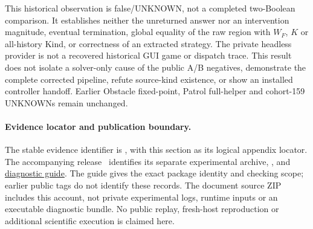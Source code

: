 This historical observation is false/UNKNOWN, not a completed two-Boolean comparison.
It establishes neither the unreturned answer nor an intervention magnitude,
eventual termination, global equality of the raw region with $W_F$, $K$
or all-history Kind, or correctness of an extracted strategy.
The private headless provider is not a recovered historical GUI game or
dispatch trace. This result does not isolate a solver-only cause of the
public A/B negatives, demonstrate the complete corrected pipeline, refute
source-kind existence, or show an installed controller handoff.
Earlier Obstacle fixed-point, Patrol full-helper and cohort-159 UNKNOWNs
remain unchanged.

\paragraph{Evidence locator and publication boundary.}
The stable evidence identifier is
, with this section as its logical
appendix locator. The accompanying release~\cite{artifactrepository}
identifies its separate experimental archive,
, and
\href{https://github.com/research-artifact-archive/seams2027/blob/controller-replacement-audit-20261026-v10/results/guides/SAME_SOLVER_DIAGNOSTIC.md}{diagnostic guide}.
The guide gives the exact package identity and checking scope; earlier
public tags do not identify these records.
The document source ZIP includes this account, not private experimental
logs, runtime inputs or an executable diagnostic bundle. No public replay,
fresh-host reproduction or additional scientific execution is claimed here.
